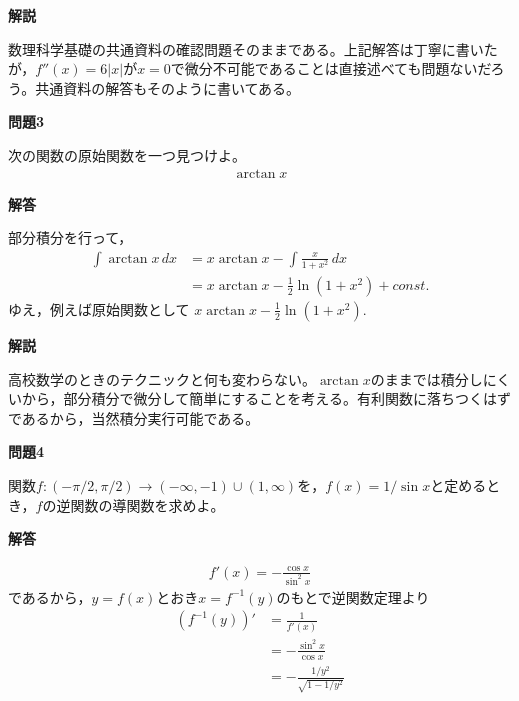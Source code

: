 \documentclass[a4paper,12pt,dvipdfmx,fleqn, oneside]{jsarticle}
\theoremstyle{defstyle}
\theoremstyle{thmx}
\theoremstyle{qesstyle}
\begin{document}
\textbf{解説}

数理科学基礎の共通資料の確認問題そのままである。上記解答は丁寧に書いたが，$f''(x)=6|x|$が$x=0$で微分不可能であることは直接述べても問題ないだろう。共通資料の解答もそのように書いてある。

\begin{shadebox}
    \textbf{問題3}

    次の関数の原始関数を一つ見つけよ。
    \begin{align*}
        \arctan x
    \end{align*}
\end{shadebox}

\begin{screen}
    \textbf{解答}

    \text{　}部分積分を行って，
    \begin{align*}
        \int \arctan x \, dx & = x \arctan x - \int \frac{x}{1+x^2} \, dx        \\
                             & = x \arctan x - \frac{1}{2} \ln (1+ x^2) + const.
    \end{align*}
    ゆえ，例えば原始関数として $x \arctan x - \frac{1}{2} \ln (1+ x^2).  $
\end{screen}

\textbf{解説}

高校数学のときのテクニックと何も変わらない。$\arctan x$のままでは積分しにくいから，部分積分で微分して簡単にすることを考える。有利関数に落ちつくはずであるから，当然積分実行可能である。

\begin{shadebox}
    \textbf{問題4}

    関数$f:(-\pi/ 2, \pi / 2) \rightarrow (- \infty , -1) \cup (1, \infty)$を，$f(x)=1/\sin x$と定めるとき，$f$の逆関数の導関数を求めよ。
\end{shadebox}

\begin{screen}
    \textbf{解答}

    \begin{align*}
        f'(x)=- \frac{\cos x}{\sin^2 x}
    \end{align*}
    であるから，$y=f(x)$とおき$x = f^{-1}(y)$のもとで逆関数定理より
    \begin{align*}
        (f^{-1}(y))' & = \frac{1}{f'(x)}                \\
                     & = - \frac{\sin ^2 x}{\cos x}     \\
                     & = - \frac{1/y^2}{\sqrt{1-1/y^2}}
    \end{align*}
\end{screen}
\end{document}

